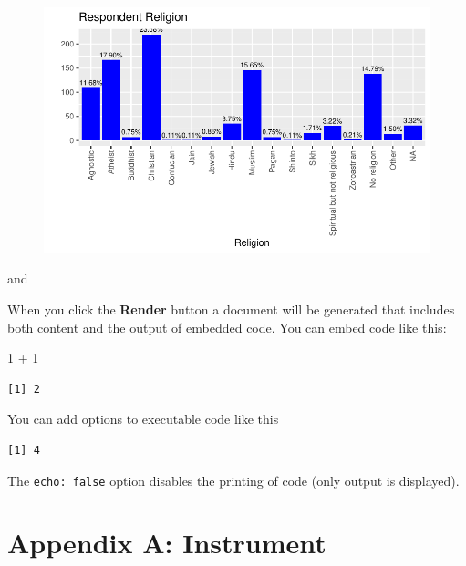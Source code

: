 \documentclass[
  letterpaper,
  DIV=11,
  numbers=noendperiod]{scrartcl}
\newenvironment{Shaded}{\begin{snugshade}}{\end{snugshade}}
\newcommand{\DecValTok}[1]{\textcolor[rgb]{0.68,0.00,0.00}{#1}}
\newcommand{\SpecialCharTok}[1]{\textcolor[rgb]{0.37,0.37,0.37}{#1}}
\begin{document}
\begin{figure}[H]

{\centering \includegraphics{final_draft_files/figure-pdf/religion-1.pdf}

}

\end{figure}

and

When you click the \textbf{Render} button a document will be generated
that includes both content and the output of embedded code. You can
embed code like this:

\begin{Shaded}
\begin{Highlighting}[]
\DecValTok{1} \SpecialCharTok{+} \DecValTok{1}
\end{Highlighting}
\end{Shaded}

\begin{verbatim}
[1] 2
\end{verbatim}

You can add options to executable code like this

\begin{verbatim}
[1] 4
\end{verbatim}

The \texttt{echo:\ false} option disables the printing of code (only
output is displayed).

\hypertarget{appendix-a-instrument}{%
\section{Appendix A: Instrument}\label{appendix-a-instrument}}
\end{document}
